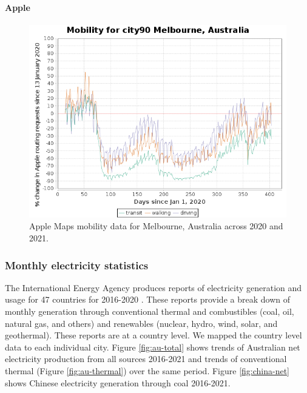 \documentclass[final,3p,times,authoryear]{elsarticle}
\begin{document}
\paragraph{Apple}
\begin{figure}
\centering
\includegraphics[width=.99\linewidth]{images/Applecity90MelbourneAustralia.png}
\caption{Apple Maps mobility data for Melbourne, Australia across 2020 and 2021.}
 \label{fig:statestr}
\end{figure}

\subsubsection{Monthly electricity statistics}
The International Energy Agency produces reports of electricity generation and usage for 47 countries for 2016-2020 \citep{IEA2021}. These reports provide a break down of monthly generation through conventional thermal and combustibles (coal, oil, natural gas, and others) and renewables (nuclear, hydro, wind, solar, and geothermal). These reports are at a country level. We mapped the country level data to each individual city. Figure \ref{fig:au-total} shows trends of Australian net electricity production from all sources 2016-2021 and trends of conventional thermal (Figure \ref{fig:au-thermal}) over the same period. Figure \ref{fig:china-net} shows Chinese electricity generation through coal 2016-2021.
\end{document}
